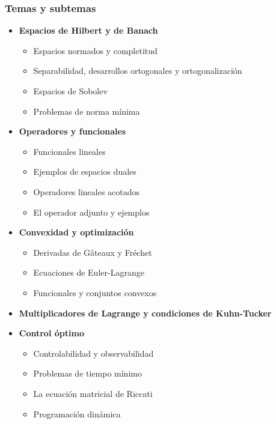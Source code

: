 \documentclass[10pt,a4paper]{article}
\begin{document}
\newpage

\subsubsection{Temas y subtemas}

\begin{itemize}
    \item \textbf{Espacios de Hilbert y de Banach}
    \begin{itemize}
        \item Espacios normados y completitud
        \item Separabilidad, desarrollos ortogonales y ortogonalización
        \item Espacios de Sobolev
        \item Problemas de norma mínima
    \end{itemize}

    \item \textbf{Operadores y funcionales}
    \begin{itemize}
        \item Funcionales lineales
        \item Ejemplos de espacios duales
        \item Operadores lineales acotados
        \item El operador adjunto y ejemplos
    \end{itemize}

    \item \textbf{Convexidad y optimización}
    \begin{itemize}
        \item Derivadas de Gâteaux y Fréchet
        \item Ecuaciones de Euler-Lagrange
        \item Funcionales y conjuntos convexos
    \end{itemize}

    \item \textbf{Multiplicadores de Lagrange y condiciones de Kuhn-Tucker}

    \item \textbf{Control óptimo}
    \begin{itemize}
        \item Controlabilidad y observabilidad
        \item Problemas de tiempo mínimo
        \item La ecuación matricial de Riccati
        \item Programación dinámica
    \end{itemize}


\end{itemize}
\end{document}
